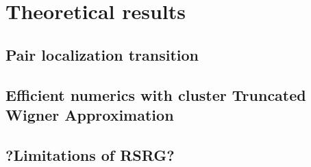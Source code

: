 \chapter{Theoretical results}

\section{Pair localization transition}

\section{Efficient numerics with cluster Truncated Wigner Approximation}

\section{?Limitations of RSRG?}